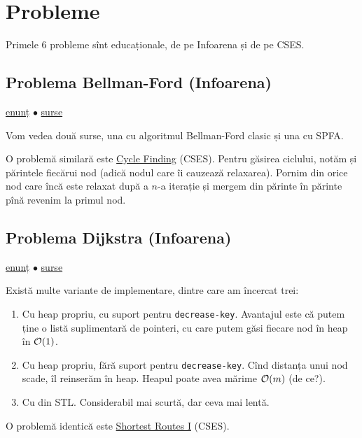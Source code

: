 \documentclass[../main.tex]{subfiles}
\begin{document}
\section{Probleme}

Primele 6 probleme sînt educaționale, de pe Infoarena și de pe CSES.

\subsection{Problema Bellman-Ford (Infoarena)}
\label{problem:bellman-ford}

\href{https://www.infoarena.ro/problema/bellmanford}{enunț}
$\bullet$
\hyperref[code:bellman-ford]{surse}

Vom vedea două surse, una cu algoritmul Bellman-Ford clasic și una cu SPFA.

O problemă similară este \href{https://cses.fi/problemset/task/1197}{Cycle Finding} (CSES). Pentru găsirea ciclului, notăm și părintele fiecărui nod (adică nodul care îi cauzează relaxarea). Pornim din orice nod care încă este relaxat după a $n$-a iterație și mergem din părinte în părinte pînă revenim la primul nod.

\subsection{Problema Dijkstra (Infoarena)}
\label{problem:dijkstra}

\href{https://www.infoarena.ro/problema/dijkstra}{enunț}
$\bullet$
\hyperref[code:dijkstra]{surse}

Există multe variante de implementare, dintre care am încercat trei:

\begin{enumerate}
  \item Cu heap propriu, cu suport pentru \texttt{decrease-key}. Avantajul este că putem ține o listă suplimentară de pointeri, cu care putem găsi fiecare nod în heap în $\mathcal{O}(1)$.

  \item Cu heap propriu, fără suport pentru \texttt{decrease-key}. Cînd distanța unui nod scade, îl reinserăm în heap. Heapul poate avea mărime $\mathcal{O}(m)$ (de ce?).

  \item Cu  din STL. Considerabil mai scurtă, dar ceva mai lentă.
\end{enumerate}

O problemă identică este \href{https://cses.fi/problemset/task/1671}{Shortest Routes I} (CSES).
\end{document}
